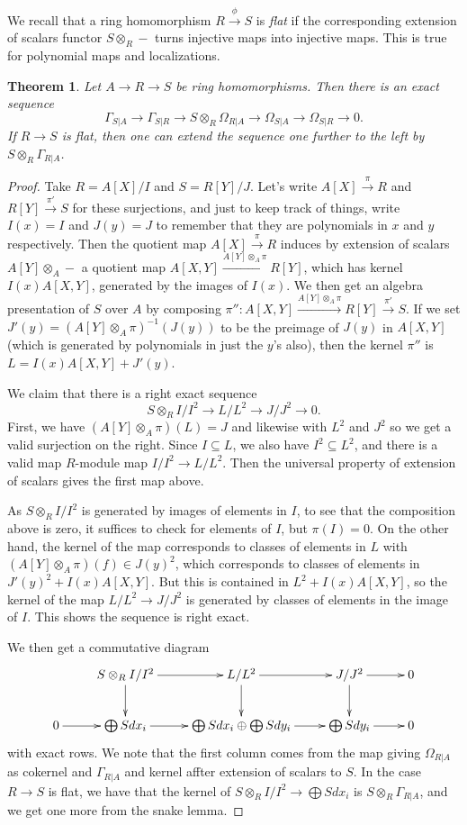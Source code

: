 \documentclass{amsart}[12pt]
\numberwithin{equation}{section}
\theoremstyle{plain} %
\newtheorem{thm}[equation]{Theorem}
\theoremstyle{definition}
\theoremstyle{remark}
\newcommand{\xra}[1]{\xrightarrow{#1}}
\begin{document}
We recall that a ring homomorphism $R\xra{\phi} S$ is \emph{flat} if the corresponding extension of scalars functor $S\otimes_R -$ turns injective maps into injective maps. This is true for polynomial maps and localizations.



\begin{thm}
Let $A\to R \to S$ be ring homomorphisms. Then there is an exact sequence
\[ \Gamma_{S|A} \to \Gamma_{S|R} \to S\otimes_R \Omega_{R|A} \to \Omega_{S|A} \to \Omega_{S|R} \to 0.\]
If $R\to S$ is flat, then one can extend the sequence one further to the left by $S\otimes_R \Gamma_{R|A}$.
\end{thm}
\begin{proof} Take $R=A[X]/I$ and $S=R[Y]/J$. Let's write $A[X] \xra{\pi} R$ and $R[Y] \xra{\pi'} S$ for these surjections, and just to keep track of things, write $I(x)=I$ and $J(y)=J$ to remember that they are polynomials in $x$ and $y$ respectively. Then the quotient map $A[X]\xra{\pi} R$ induces by extension of scalars $A[Y] \otimes_A -$ a quotient map $A[X,Y]\xra{A[Y]\otimes_A \pi} R[Y]$, which has kernel $I(x)A[X,Y]$, generated by the images of $I(x)$. We then get an algebra presentation of $S$ over $A$ by composing $\pi'': A[X,Y] \xra{A[Y]\otimes_A \pi} R[Y] \xra{\pi'} S$. If we set $J'(y)=(A[Y]\otimes_A \pi)^{-1}(J(y))$ to be the preimage of $J(y)$ in $A[X,Y]$ (which is generated by polynomials in just the $y$'s also), then the kernel $\pi''$ is $L=I(x)A[X,Y]+J'(y)$.

We claim that there is a right exact sequence
\[ S\otimes_R I/I^2 \to L/L^2 \to J/J^2 \to 0.\]
First, we have $(A[Y]\otimes_A \pi)(L)= J$ and likewise with $L^2$ and $J^2$ so we get a valid surjection on the right. Since $I\subseteq L$, we also have $I^2 \subseteq L^2$, and there is a valid map $R$-module map $I/I^2 \to L/L^2$. Then the universal property of extension of scalars gives the first map above. 

As $S\otimes_R I/I^2$ is generated by images of elements in $I$, to see that the composition above is zero, it suffices to check for elements of $I$, but $\pi(I)=0$. On the other hand, the kernel of the map corresponds to classes of elements in $L$ with $(A[Y]\otimes_A \pi)(f)\in J(y)^2$, which corresponds to classes of elements in $J'(y)^2 + I(x) A[X,Y]$. But this is contained in $L^2 + I(x)A[X,Y]$, so the kernel of the map $L/L^2\to J/J^2$ is generated by classes of elements in the image of $I$. This shows the sequence is right exact.

 We then get a commutative diagram
\[ \xymatrix{ & S\otimes_R I/I^2 \ar[r] \ar[d]& L/L^2 \ar[r] \ar[d] & J/J^2 \ar[r] \ar[d]& 0 \\
0\ar[r] & \bigoplus S dx_i \ar[r] &  \bigoplus S dx_i \oplus  \bigoplus S dy_i\ar[r] &  \bigoplus S dy_i \ar[r] &0}\]
with exact rows. We note that the first column comes from the map giving $\Omega_{R|A}$ as cokernel and $\Gamma_{R|A}$ and kernel affter extension of scalars to $S$. In the case $R\to S$ is flat, we have that the kernel of $S\otimes_R I/I^2 \to \bigoplus S dx_i$ is $S\otimes_R \Gamma_{R|A}$, and we get one more from the snake lemma.
\end{proof}
\end{document}
